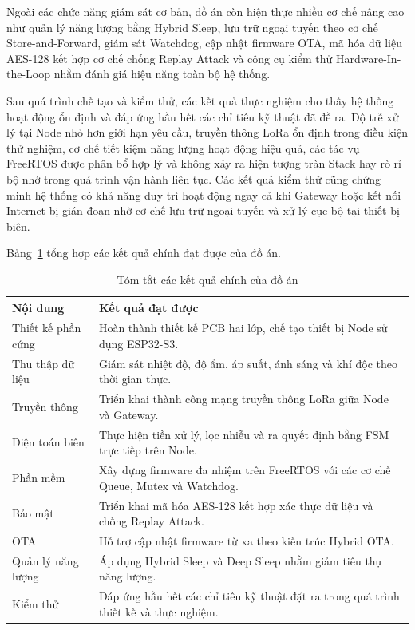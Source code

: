 Ngoài các chức năng giám sát cơ bản, đồ án còn hiện thực nhiều cơ chế nâng cao như quản lý năng lượng bằng Hybrid Sleep, lưu trữ ngoại tuyến theo cơ chế Store-and-Forward, giám sát Watchdog, cập nhật firmware OTA, mã hóa dữ liệu AES-128 kết hợp cơ chế chống Replay Attack và công cụ kiểm thử Hardware-In-the-Loop nhằm đánh giá hiệu năng toàn bộ hệ thống.

Sau quá trình chế tạo và kiểm thử, các kết quả thực nghiệm cho thấy hệ thống hoạt động ổn định và đáp ứng hầu hết các chỉ tiêu kỹ thuật đã đề ra. Độ trễ xử lý tại Node nhỏ hơn giới hạn yêu cầu, truyền thông LoRa ổn định trong điều kiện thử nghiệm, cơ chế tiết kiệm năng lượng hoạt động hiệu quả, các tác vụ FreeRTOS được phân bổ hợp lý và không xảy ra hiện tượng tràn Stack hay rò rỉ bộ nhớ trong quá trình vận hành liên tục. Các kết quả kiểm thử cũng chứng minh hệ thống có khả năng duy trì hoạt động ngay cả khi Gateway hoặc kết nối Internet bị gián đoạn nhờ cơ chế lưu trữ ngoại tuyến và xử lý cục bộ tại thiết bị biên.

Bảng~\ref{tab:summary_result} tổng hợp các kết quả chính đạt được của đồ án.

\begin{table}[H]
\centering
\caption{Tóm tắt các kết quả chính của đồ án}
\label{tab:summary_result}
\begin{tabular}{p{5cm} p{9cm}}
\hline
\textbf{Nội dung} & \textbf{Kết quả đạt được} \\ \hline
Thiết kế phần cứng &
Hoàn thành thiết kế PCB hai lớp, chế tạo thiết bị Node sử dụng ESP32-S3. \\ 

Thu thập dữ liệu &
Giám sát nhiệt độ, độ ẩm, áp suất, ánh sáng và khí độc theo thời gian thực. \\

Truyền thông &
Triển khai thành công mạng truyền thông LoRa giữa Node và Gateway. \\

Điện toán biên &
Thực hiện tiền xử lý, lọc nhiễu và ra quyết định bằng FSM trực tiếp trên Node. \\ 

Phần mềm &
Xây dựng firmware đa nhiệm trên FreeRTOS với các cơ chế Queue, Mutex và Watchdog. \\ 

Bảo mật &
Triển khai mã hóa AES-128 kết hợp xác thực dữ liệu và chống Replay Attack. \\ 

OTA &
Hỗ trợ cập nhật firmware từ xa theo kiến trúc Hybrid OTA. \\ 
Quản lý năng lượng &
Áp dụng Hybrid Sleep và Deep Sleep nhằm giảm tiêu thụ năng lượng. \\

Kiểm thử &
Đáp ứng hầu hết các chỉ tiêu kỹ thuật đặt ra trong quá trình thiết kế và thực nghiệm. \\ \hline
\end{tabular}
\end{table}


